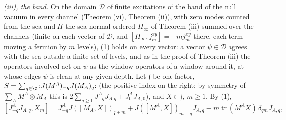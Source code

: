 \emph{(iii), the band.} On the domain $\mathcal{D}$ of finite excitations of the band of the null vacuum in every channel (Theorem (vi), Theorem (ii)), with zero modes counted from the sea and $H$ the sea-normal-ordered $H_{\infty}$ of Theorem (iii) summed over the channels (finite on each vector of $\mathcal{D}$, and $[H_{\infty}, j^{xy}_{m}] = -mj^{xy}_{m}$ there, each term moving a fermion by $m$ levels), (1) holds on every vector: a vector $\psi \in \mathcal{D}$ agrees with the sea outside a finite set of levels, and as in the proof of Theorem (iii) the operators involved act on $\psi$ as the window operators of a window around it, at whose edges $\psi$ is clean at any given depth. Let $\mathfrak{f}$ be one factor, $S = \sum_{q \in \Z}{:}J(M^{A})_{-q}J(M_{A})_{q}{:}$ (the positive index on the right; by symmetry of $\sum_{A}M^{A}\otimes M_{A}$ this is $2\sum_{q \ge 1}J^{A}_{-q}J_{A,q} + J^{A}_{0}J_{A,0}$), and $X \in \mathfrak{f}$, $m \ge 1$. By (1),
\[
[J^{A}_{-q}J_{A,q}, X_{m}] = J^{A}_{-q}J([M_{A}, X])_{q+m} + J([M^{A}, X])_{m-q}J_{A,q} - m\operatorname{tr}(M^{A}X)\,\delta_{qm}J_{A,q},
\]
